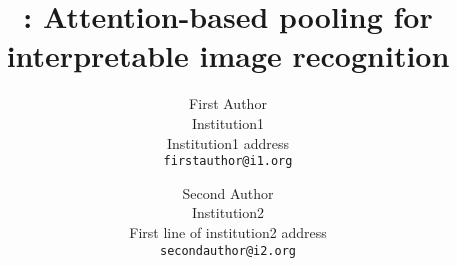 \documentclass[10pt,twocolumn,letterpaper]{article}
\begin{document}



\title{\Ours: Attention-based pooling for interpretable image recognition}

\author{First Author\\
Institution1\\
Institution1 address\\
{\tt\small firstauthor@i1.org}
\and
Second Author\\
Institution2\\
First line of institution2 address\\
{\tt\small secondauthor@i2.org}
}

\ifwacvfinal\thispagestyle{empty}\fi



\end{document}
